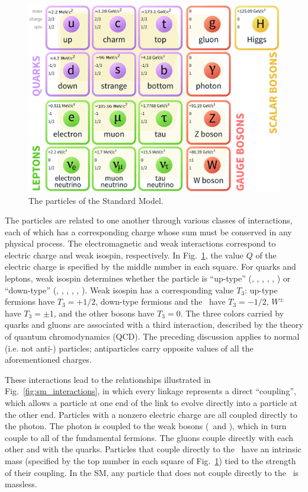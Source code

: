 \documentclass[oneside, letterpaper, 12pt, oldfontcommands]{memoir}
\begin{document}
\begin{figure}[hbtp]
  \begin{center}
    \includegraphics[width=1.0\textwidth]{Figures/sm_particles.png}
    \caption{
      The particles of the Standard Model.
    }
    \label{fig:sm_particles}
  \end{center}
\end{figure}

The particles are related to one another through various
classes of interactions, each of which has a corresponding charge whose sum must be conserved in any physical process.
The electromagnetic and weak interactions correspond to electric charge and weak isospin, respectively.
In Fig.~\ref{fig:sm_particles}, the value $Q$ of the electric charge is specified by the middle number in each square.
For quarks and leptons, weak isospin determines whether the particle is ``up-type''
(\Pu, \Pd, \Pt, \Pne, \Pnmu, \Pntau) or ``down-type'' (\Pd, \Ps, \Pb, \Pe, \Pmu, \Ptau).
Weak isospin has a corresponding value $T_{3}$: up-type fermions have $T_{3} = \mathrm{+}1/2$, down-type fermions and the \PH\ have
$T_{3} = \mathrm{-}1/2$, $W^\pm$ have $T_{3} = \pm1$, and the other bosons have $T_{3} = 0$.
The three colors carried by quarks and gluons are associated with a third interaction, described by the theory of quantum
chromodynamics (QCD). The preceding discussion applies to normal (i.e. not anti-) particles; antiparticles carry opposite values of all the
aforementioned charges.

These interactions lead to the relationships illustrated in Fig.~\ref{fig:sm_interactions}, in which every linkage represents
a direct ``coupling'', which allows a particle at one end of the link to evolve directly into a particle at the other end.
Particles with a nonzero electric charge are all coupled directly to the photon. The photon is coupled to the weak bosons
(\PZ\ and \PW), which in turn couple to all of the fundamental fermions.
The gluons couple directly with each other and with the quarks.
Particles that couple directly to the \PH\ have an intrinsic mass (specified by the top number in each square of Fig.~\ref{fig:sm_particles})
tied to the strength of their coupling. In the SM, any particle that does not couple directly to the \PH\ is massless.
\end{document}
